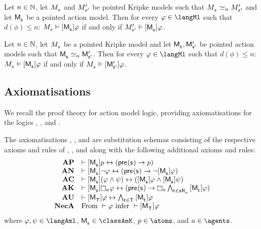 \begin{proposition}
Let $n \in \mathbb{N}$,
let $\kPModel{\kStateS}$ and ${M^{\prime}_{{s}^{\prime}}}$ be pointed Kripke models such that $\kPModel{\kStateS} \bisimilar[n] \kPModelP{\kStateSP}$ and
let $\aPModel{\aStateS}$ be a pointed action model.
Then for every $\phi \in \langMl$ such that $d(\phi) \leq n$: $\kPModel{\kStateS} \entails \actionA{\aPModel{\aStateS}} \phi$ if and only if $\kPModelP{\kStateSP} \entails \actionA{\aPModel{\aStateS}} \phi$.
\end{proposition}

\begin{proposition}
Let $n \in \mathbb{N}$,
let $\kPModel{\kStateS}$ be a pointed Kripke model and
let $\aPModel{\aStateS}, \aPModelP{\aStateSP}$ be pointed action models such that $\aPModel{\aStateS} \bisimilar[n] \aPModelP{\aStateSP}$.
Then for every $\phi \in \langMl$ such that $d(\phi) \leq n$: $\kPModel{\kStateS} \entails \actionA{\aPModel{\aStateS}} \phi$ if and only if $\kPModel{\kStateS} \entails \actionA{\aPModelP{\aStateSP}} \phi$.
\end{proposition}

\subsection{Axiomatisations}

We recall the proof theory for action model logic, providing axiomatisations for the logics \logicAmlK{}, \logicAmlKFF{}, and \logicAmlS{}.

\begin{definition}
The axiomatisations \axiomAmlK{}, \axiomAmlKFF{}, and \axiomAmlS{} are substitution schemas consisting of the respective axioms and rules of \axiomK{}, \axiomKFF{}, and \axiomS{} along with the following additional axioms and rules:
$$
\begin{array}{rl}
    {\bf AP} & \proves \actionA{\aPModel{\aStateS}} \atomP \iff (\aPrecondition(\aStateS) \implies \atomP)\\
    {\bf AN} & \proves \actionA{\aPModel{\aStateS}} \lnot \phi \iff (\aPrecondition(\aStateS) \implies \lnot \actionA{\aPModel{\aStateS}} \phi)\\
    {\bf AC} & \proves \actionA{\aPModel{\aStateS}} (\phi \land \psi) \iff (\actionA{\aPModel{\aStateS}} \phi \land \actionA{\aPModel{\aStateS}} \psi)\\
    {\bf AK} & \proves \actionA{\aPModel{\aStateS}} \necessaryA \phi \iff (\aPrecondition(\aStateS) \implies \necessaryA \bigwedge_{\aStateT \in \aSuccessorsA{\aStateS}} \actionA{\aPModel{\aStateT}} \phi)\\
    {\bf AU} & \proves \actionA{\aPModel{\aStatesT}} \phi \iff \bigwedge_{\aStateT \in \aStatesT} \actionA{\aPModel{\aStateT}} \phi\\
    {\bf NecA} & \text{From } \proves \phi \text{ infer } \proves \actionA{\aPModel{\aStatesT}} \phi
\end{array}
$$
where $\phi, \psi \in \langAml$, $\aPModel{\aStateS} \in \classAmK$, $\atomP \in \atoms$, and $\agentA \in \agents$.
\end{definition}

